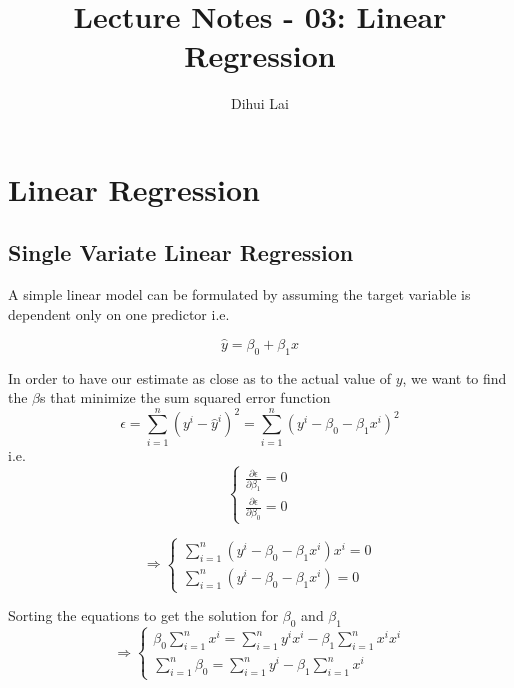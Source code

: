 \documentclass[12pt, oneside]{article}
\title{Lecture Notes - 03: Linear Regression}
\author{Dihui Lai}
\begin{document}
\maketitle
\tableofcontents

\vspace{.25in}
\section{Linear Regression}

\subsection{Single Variate Linear Regression}
A simple linear model can be formulated by assuming the target variable is dependent only on one predictor i.e.

$$\hat{y}=\beta_0+\beta_1 x$$

In order to have our estimate as close as to the actual value of $y$, we want to find the $\beta$s that minimize the sum squared error function
\begin{equation}
\epsilon=\sum_{i=1}^n(y^i-\hat{y}^i)^2=\sum_{i=1}^n(y^i-\beta_0-\beta_1 x^i)^2
\end{equation}
i.e.
\begin{equation}
\begin{cases}
\frac{\partial \epsilon}{\partial {\beta}_1}=0\\
\frac{\partial \epsilon}{\partial {\beta}_0}=0

\end{cases}
\end{equation}

\begin{equation}
\Rightarrow
\begin{cases}
\sum\limits_{i=1}^{n}(y^{i}-{\beta_0}-{\beta_1} x^{i})x^{i}=0\\
\sum\limits_{i=1}^{n}(y^{i}-{\beta_0}-{\beta_1} x^{i})=0
\end{cases}
\end{equation}

Sorting the equations to get the solution for $\beta_0$ and $\beta_1$
\begin{equation*}
\Rightarrow
\begin{cases}
{\beta_0}\sum\limits_{i=1}^{n}x^{i}=\sum\limits_{i=1}^{n}y^{i}x^{i}-{\beta_1}\sum\limits_{i=1}^{n} x^{i}x^{i}\\
\sum\limits_{i=1}^{n}{\beta_0}=\sum\limits_{i=1}^{n}y^{i}-{\beta_1}\sum\limits_{i=1}^{n} x^{i}
\end{cases}
\end{equation*}
\end{document}

